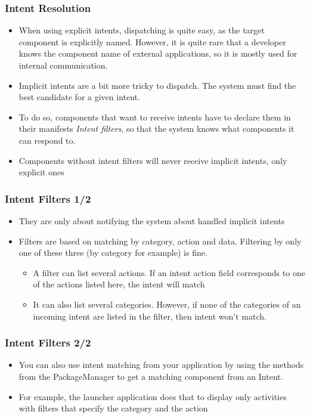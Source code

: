 \begin{frame}
  \frametitle{Intent Resolution}
  \begin{itemize}
  \item When using explicit intents, dispatching is quite easy, as
    the target component is explicitly named. However, it is quite
    rare that a developer knows the component name of external
    applications, so it is mostly used for internal communication.
  \item Implicit intents are a bit more tricky to dispatch. The system
    must find the best candidate for a given intent.
  \item To do so, components that want to receive intents have to
    declare them in their manifests \emph{Intent filters}, so that the
    system knows what components it can respond to.
  \item Components without intent filters will never receive implicit
    intents, only explicit ones
  \end{itemize}
\end{frame}

\begin{frame}
  \frametitle{Intent Filters 1/2}
  \begin{itemize}
  \item They are only about notifying the system about handled implicit
    intents
  \item Filters are based on matching by category, action and data.
    Filtering by only one of these three (by category for example) is fine.
    \begin{itemize}
    \item A filter can list several actions. If an intent action field
      corresponds to one of the actions listed here, the intent
      will match
    \item It can also list several categories. However, if none of the
      categories of an incoming intent are listed in the filter,
      then intent won't match.
    \end{itemize}
  \end{itemize}
\end{frame}

\begin{frame}
  \frametitle{Intent Filters 2/2}
  \begin{itemize}
  \item You can also use intent matching from your application by
    using the  methods from the PackageManager to get a
    matching component from an Intent.
  \item For example, the launcher application does that to display
    only activities with filters that specify the category
     and the action
  \end{itemize}
\end{frame}

